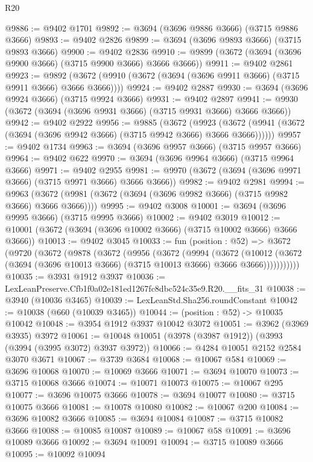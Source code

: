 \begin{lexlean}{R20}
\begin{coremodule}
@9886 := @9402 @1701
@9892 := @3694 (@3696 @9886 @3666) (@3715 @9886 @3666)
@9893 := @9402 @2826
@9899 := @3694 (@3696 @9893 @3666) (@3715 @9893 @3666)
@9900 := @9402 @2836
@9910 := @9899 (@3672 (@3694 (@3696 @9900 @3666) (@3715 @9900 @3666) @3666 @3666))
@9911 := @9402 @2861
@9923 := @9892 (@3672 (@9910 (@3672 (@3694 (@3696 @9911 @3666) (@3715 @9911 @3666) @3666 @3666))))
@9924 := @9402 @2887
@9930 := @3694 (@3696 @9924 @3666) (@3715 @9924 @3666)
@9931 := @9402 @2897
@9941 := @9930 (@3672 (@3694 (@3696 @9931 @3666) (@3715 @9931 @3666) @3666 @3666))
@9942 := @9402 @2922
@9956 := @9885
    (@3672
      (@9923 (@3672 (@9941 (@3672 (@3694 (@3696 @9942 @3666) (@3715 @9942 @3666) @3666 @3666))))))
@9957 := @9402 @1734
@9963 := @3694 (@3696 @9957 @3666) (@3715 @9957 @3666)
@9964 := @9402 @622
@9970 := @3694 (@3696 @9964 @3666) (@3715 @9964 @3666)
@9971 := @9402 @2955
@9981 := @9970 (@3672 (@3694 (@3696 @9971 @3666) (@3715 @9971 @3666) @3666 @3666))
@9982 := @9402 @2981
@9994 := @9963 (@3672 (@9981 (@3672 (@3694 (@3696 @9982 @3666) (@3715 @9982 @3666) @3666 @3666))))
@9995 := @9402 @3008
@10001 := @3694 (@3696 @9995 @3666) (@3715 @9995 @3666)
@10002 := @9402 @3019
@10012 := @10001 (@3672 (@3694 (@3696 @10002 @3666) (@3715 @10002 @3666) @3666 @3666))
@10013 := @9402 @3045
@10033 := fun (position : @52) =>
  @3672
    (@9720
      (@3672
        (@9878
          (@3672
            (@9956
              (@3672
                (@9994
                  (@3672
                    (@10012
                      (@3672 (@3694 (@3696 @10013 @3666) (@3715 @10013 @3666) @3666 @3666)))))))))))
@10035 := @3931 @1912 @3937
@10036 := LexLeanPreserve.Cfb1f0a02e181ed1267fc8dbc524c35e9.R20.__fits_31
@10038 := @3940 (@10036 @3465)
@10039 := LexLeanStd.Sha256.roundConstant
@10042 := @10038 (@660 (@10039 @3465))
@10044 := (position : @52) -> @10035 @10042
@10048 := @3954 @1912 @3937 @10042 @3072
@10051 := @3962 (@3969 @3935) @3972
@10061 := @10048 @10051 (@3978 (@3987 @1912)) (@3993 (@3994 (@3995 @3072) @3937 @3972))
@10066 := @4284 @10051 @2152 @2584 @3070 @3671
@10067 := @3739 @3684
@10068 := @10067 @584
@10069 := @3696 @10068
@10070 := @10069 @3666
@10071 := @3694 @10070
@10073 := @3715 @10068 @3666
@10074 := @10071 @10073
@10075 := @10067 @295
@10077 := @3696 @10075 @3666
@10078 := @3694 @10077
@10080 := @3715 @10075 @3666
@10081 := @10078 @10080
@10082 := @10067 @200
@10084 := @3696 @10082 @3666
@10085 := @3694 @10084
@10087 := @3715 @10082 @3666
@10088 := @10085 @10087
@10089 := @10067 @58
@10091 := @3696 @10089 @3666
@10092 := @3694 @10091
@10094 := @3715 @10089 @3666
@10095 := @10092 @10094

\end{coremodule}
\end{lexlean}
